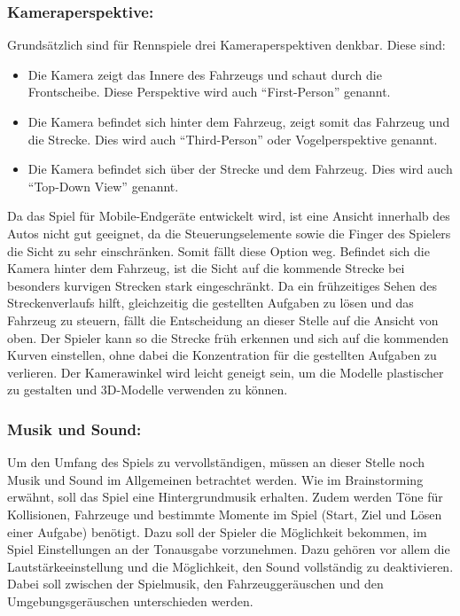	\subsubsection*{Kameraperspektive:}
		Grundsätzlich sind für Rennspiele drei Kameraperspektiven denkbar. Diese sind:
		\begin{itemize}
			\item{ Die Kamera zeigt das Innere des Fahrzeugs und schaut durch die Frontscheibe. Diese Perspektive wird auch \enquote{First-Person} genannt. }
			\item{ Die Kamera befindet sich hinter dem Fahrzeug, zeigt somit das Fahrzeug und die Strecke. Dies wird auch \enquote{Third-Person} oder Vogelperspektive genannt. }
			\item{ Die Kamera befindet sich über der Strecke und dem Fahrzeug. Dies wird auch \enquote{Top-Down View} genannt. }
		\end{itemize}
		Da das Spiel für Mobile-Endgeräte entwickelt wird, ist eine Ansicht innerhalb des Autos nicht gut geeignet, da die Steuerungselemente sowie die Finger des Spielers die Sicht zu sehr einschränken. Somit fällt diese Option weg.
		Befindet sich die Kamera hinter dem Fahrzeug, ist die Sicht auf die kommende Strecke bei besonders kurvigen Strecken stark eingeschränkt. Da ein frühzeitiges Sehen des Streckenverlaufs hilft, gleichzeitig die gestellten Aufgaben zu lösen und das Fahrzeug zu steuern, fällt die Entscheidung an dieser Stelle auf die Ansicht von oben.
		Der Spieler kann so die Strecke früh erkennen und sich auf die kommenden Kurven einstellen, ohne dabei die Konzentration für die gestellten Aufgaben zu verlieren. Der Kamerawinkel wird leicht geneigt sein, um die Modelle plastischer zu gestalten und 3D-Modelle verwenden zu können.

	\subsubsection*{Musik und Sound:}
		Um den Umfang des Spiels zu vervollständigen, müssen an dieser Stelle noch Musik und Sound im Allgemeinen betrachtet werden. Wie im Brainstorming erwähnt, soll das Spiel eine Hintergrundmusik erhalten. Zudem werden Töne für Kollisionen, Fahrzeuge und bestimmte Momente im Spiel (Start, Ziel und Lösen einer Aufgabe) benötigt.
		Dazu soll der Spieler die Möglichkeit bekommen, im Spiel Einstellungen an der Tonausgabe vorzunehmen. Dazu gehören vor allem die Lautstärkeeinstellung und die Möglichkeit, den Sound vollständig zu deaktivieren. Dabei soll zwischen der Spielmusik, den Fahrzeuggeräuschen und den Umgebungsgeräuschen unterschieden werden.

